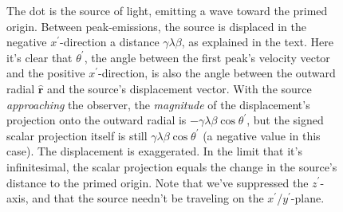 \documentclass[12pt]{article}
\renewcommand{\vv}[1]{\mathbf{#1}}
\begin{document}
\begin{figure}[h]

\caption{The dot is the source of light, emitting a wave toward the primed origin. Between peak-emissions, the source is displaced in the negative $x^\prime$-direction a distance $\gamma \lambda \beta$, as explained in the text. Here it's clear that $\theta^\prime$, the angle between the first peak's velocity vector and the positive $x^\prime$-direction, is also the angle between the outward radial $\vv{\hat{r}}$ and the source's displacement vector. With the source \emph{approaching} the observer, the \emph{magnitude} of the displacement's projection onto the outward radial is $- \gamma \lambda \beta \cos \theta^\prime$, but the signed scalar projection itself is still $\gamma \lambda \beta \cos \theta^\prime$ (a negative value in this case). The displacement is exaggerated. In the limit that it's infinitesimal, the scalar projection equals the change in the source's distance to the primed origin. Note that we've suppressed the $z^\prime$-axis, and that the source needn't be traveling on the $x^\prime$/$y^\prime$-plane.}
\label{f:doppler}

\end{figure}
\end{document}
